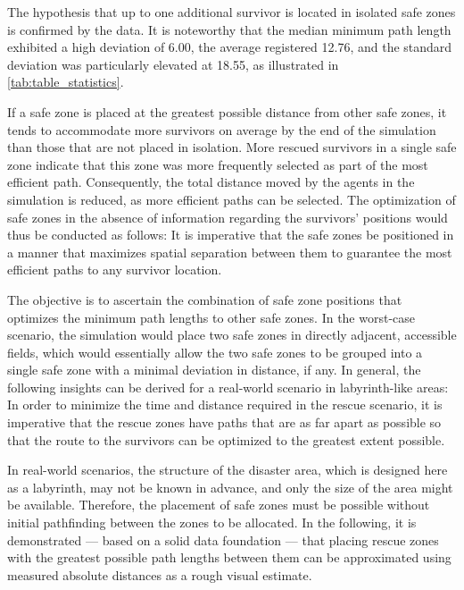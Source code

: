 \documentclass[3p,times,procedia]{elsarticle}
\begin{document}

The hypothesis that up to one additional survivor is located in isolated safe zones is confirmed by the data.
It is noteworthy that the median minimum path length exhibited a high deviation of 6.00, the average registered 12.76, and the standard deviation was particularly elevated at 18.55, as illustrated in \autoref{tab:table_statistics}.

If a safe zone is placed at the greatest possible distance from other safe zones, it tends to accommodate more survivors on average by the end of the simulation than those that are not placed in isolation. 
More rescued survivors in a single safe zone indicate that this zone was more frequently selected as part of the most efficient path.
Consequently, the total distance moved by the agents in the simulation is reduced, as more efficient paths can be selected.
The optimization of safe zones in the absence of information regarding the survivors' positions would thus be conducted as follows: 
It is imperative that the safe zones be positioned in a manner that maximizes spatial separation between them to guarantee the most efficient paths to any survivor location.

The objective is to ascertain the combination of safe zone positions that optimizes the minimum path lengths to other safe zones.
In the worst-case scenario, the simulation would place two safe zones in directly adjacent, accessible fields, which would essentially allow the two safe zones to be grouped into a single safe zone with a minimal deviation in distance, if any.
In general, the following insights can be derived for a real-world scenario in labyrinth-like areas:
In order to minimize the time and distance required in the rescue scenario, it is imperative that the rescue zones have paths that are as far apart as possible so that the route to the survivors can be optimized to the greatest extent possible.

In real-world scenarios, the structure of the disaster area, which is designed here as a labyrinth, may not be known in advance, and only the size of the area might be available.
Therefore, the placement of safe zones must be possible without initial pathfinding between the zones to be allocated.
In the following, it is demonstrated — based on a solid data foundation — that placing rescue zones with the greatest possible path lengths between them can be approximated using measured absolute distances as a rough visual estimate.
\end{document}
